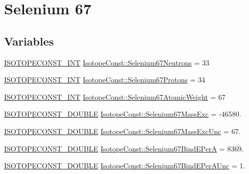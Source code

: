 \hypertarget{group___isotope_const-_selenium-_se67}{}\section{Selenium 67}
\label{group___isotope_const-_selenium-_se67}
\subsection*{Variables}
\begin{DoxyCompactItemize}
\item 
\mbox{\hyperlink{group___isotope_const-_macros_ga5f18360b3e99483a35c32d789e62621c}{I\+S\+O\+T\+O\+P\+E\+C\+O\+N\+S\+T\+\_\+\+I\+NT}} \mbox{\hyperlink{group___isotope_const-_selenium-_se67_ga02842b2473da216649bb78f03e517536}{Isotope\+Const\+::\+Selenium67\+Neutrons}} = 33
\item 
\mbox{\hyperlink{group___isotope_const-_macros_ga5f18360b3e99483a35c32d789e62621c}{I\+S\+O\+T\+O\+P\+E\+C\+O\+N\+S\+T\+\_\+\+I\+NT}} \mbox{\hyperlink{group___isotope_const-_selenium-_se67_gaa217e7644893cf25fcdb9ff111bb7655}{Isotope\+Const\+::\+Selenium67\+Protons}} = 34
\item 
\mbox{\hyperlink{group___isotope_const-_macros_ga5f18360b3e99483a35c32d789e62621c}{I\+S\+O\+T\+O\+P\+E\+C\+O\+N\+S\+T\+\_\+\+I\+NT}} \mbox{\hyperlink{group___isotope_const-_selenium-_se67_gad2b77d3e1f67bce9460ad27ced8c9e40}{Isotope\+Const\+::\+Selenium67\+Atomic\+Weight}} = 67
\item 
\mbox{\hyperlink{group___isotope_const-_macros_ga8f45a7272ce02c0b4c65c44636ed719a}{I\+S\+O\+T\+O\+P\+E\+C\+O\+N\+S\+T\+\_\+\+D\+O\+U\+B\+LE}} \mbox{\hyperlink{group___isotope_const-_selenium-_se67_ga05c65ec2e6efe8e7b7b1c64cf362316b}{Isotope\+Const\+::\+Selenium67\+Mass\+Exc}} = -\/46580.
\item 
\mbox{\hyperlink{group___isotope_const-_macros_ga8f45a7272ce02c0b4c65c44636ed719a}{I\+S\+O\+T\+O\+P\+E\+C\+O\+N\+S\+T\+\_\+\+D\+O\+U\+B\+LE}} \mbox{\hyperlink{group___isotope_const-_selenium-_se67_gaf8b3a6821f7ddc0287fedb4701572d49}{Isotope\+Const\+::\+Selenium67\+Mass\+Exc\+Unc}} = 67.
\item 
\mbox{\hyperlink{group___isotope_const-_macros_ga8f45a7272ce02c0b4c65c44636ed719a}{I\+S\+O\+T\+O\+P\+E\+C\+O\+N\+S\+T\+\_\+\+D\+O\+U\+B\+LE}} \mbox{\hyperlink{group___isotope_const-_selenium-_se67_gabd325c05c4d8025c04df7a3a68723559}{Isotope\+Const\+::\+Selenium67\+Bind\+E\+PerA}} = 8369.
\item 
\mbox{\hyperlink{group___isotope_const-_macros_ga8f45a7272ce02c0b4c65c44636ed719a}{I\+S\+O\+T\+O\+P\+E\+C\+O\+N\+S\+T\+\_\+\+D\+O\+U\+B\+LE}} \mbox{\hyperlink{group___isotope_const-_selenium-_se67_gaf368558131f019a182b4f9ca62d3860c}{Isotope\+Const\+::\+Selenium67\+Bind\+E\+Per\+A\+Unc}} = 1.

\end{DoxyCompactItemize}

